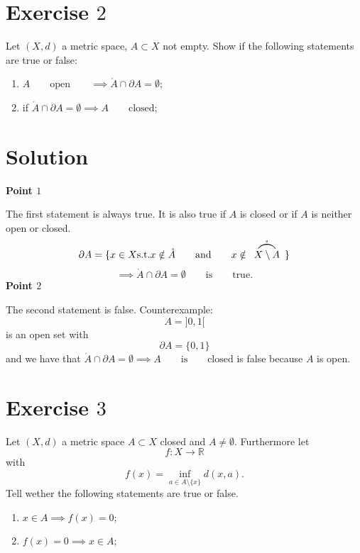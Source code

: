 \documentclass[a4paper, twoside, openany]{book}
\newcommand\bigfrown[2][\textstyle]{\ensuremath{%
  \array[b]{c}\text{\scalebox{2}{$#1\frown$}}\\[-1.3ex]#1#2\endarray}}
\begin{document}
\section*{Exercise $2$}
Let $(X, d)$ a metric space, $A \subset X$ not empty. Show if the following statements are true or false:
\begin{enumerate}
\item $A \qquad \textrm{open} \qquad \implies \mathring{A} \cap \partial A = \emptyset$;
\item if $\mathring{A} \cap \partial A = \emptyset \implies A \qquad \textrm{closed}$;
\end{enumerate}
\section*{Solution}
\textbf{Point $1$} \par 
The first statement is always true. It is also true if $A$ is closed or if $A$ is neither open or closed.
$$\partial A = \{ x \in X \textrm{s.t.} x \notin \mathring{A} \qquad \textrm{and} \qquad x \notin \mathring{\bigfrown{X \setminus A}} \}$$
$$\implies \mathring{A} \cap \partial A = \emptyset \qquad \textrm{is} \qquad \textrm{true}.$$
\textbf{Point $2$} \par  
The second statement is false. Counterexample:
$$A = ]0, 1[$$
is an open set with
$$\partial A = \{ 0, 1 \}$$
and we have that $\mathring{A} \cap \partial A = \emptyset \implies A \qquad \textrm{is} \qquad \textrm{closed}$ is false because $A$ is open.
\clearpage
\section*{Exercise $3$}
Let $(X, d)$ a metric space $A \subset X$ closed and $A \neq \emptyset$. Furthermore let
$$f: X \rightarrow \mathbb{R}$$
with
$$f(x) = \inf_{a \in A \setminus \{ x \}} d(x, a).$$
Tell wether the following statements are true or false.
\begin{enumerate}
\item $x \in A \implies f(x) = 0$;
\item $f(x) = 0 \implies x \in A$;
\end{enumerate}
\end{document}
